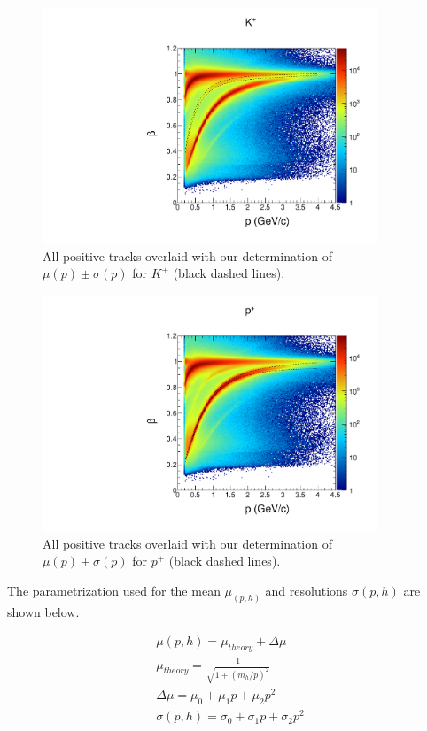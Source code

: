 \begin{figure}
  \begin{center}
    \includegraphics[width=10cm]{image/plots/hadron-id/beautiful_pbeta_kp.pdf}
    \caption{All positive tracks overlaid with our determination of $\mu(p) \pm \sigma(p)$ for $K^+$ (black dashed lines).}
  \end{center}
\end{figure}

\begin{figure}
  \begin{center}
    \includegraphics[width=10cm]{image/plots/hadron-id/beautiful_pbeta_prot.pdf}
    \caption{All positive tracks overlaid with our determination of $\mu(p) \pm \sigma(p)$ for $p^+$ (black dashed lines).}
  \end{center}
\end{figure}

The parametrization used for the mean $\mu_ (p,h)$ and resolutions $\sigma (p,h)$ are shown below.

\begin{eqnarray}  
  \mu (p,h) = \mu_{theory} + \Delta \mu       \\
  \mu_{theory} = \frac{1}{\sqrt{1+(m_h/p)^2}} \\
  \Delta \mu = \mu_0 + \mu_1 p + \mu_2 p^2    \\
  \sigma (p,h) = \sigma_0 + \sigma_1 p + \sigma_2 p^2
\end{eqnarray}


